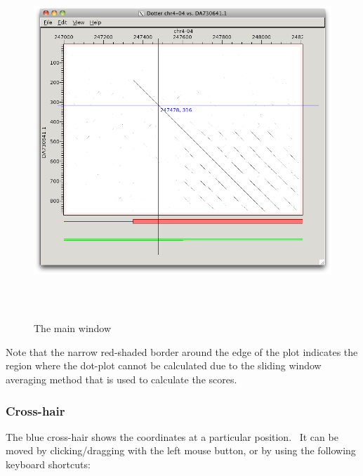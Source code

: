 \documentclass[letterpaper]{article}
\begin{document}
\begin{figure}
 \centering
 \color[rgb]{0.30980393,0.5058824,0.7411765}
  \includegraphics[width=14.88cm,height=13.457cm]{img_window_main.png}
 \caption{The main window}
\end{figure}

\bigskip

{Note that the narrow red-shaded border around the edge of the plot
indicates the region where the dot-plot cannot be calculated due to the
sliding window averaging method that is used to calculate the scores. }

\bigskip
{\color[rgb]{0.30980393,0.5058824,0.7411765}\subsubsection[Cross{}-hair]{Cross-hair}}
{The blue cross-hair shows the coordinates at a particular position. \ It
can be moved by clicking/dragging with the left mouse button, or by
using the following keyboard shortcuts:}
\end{document}
